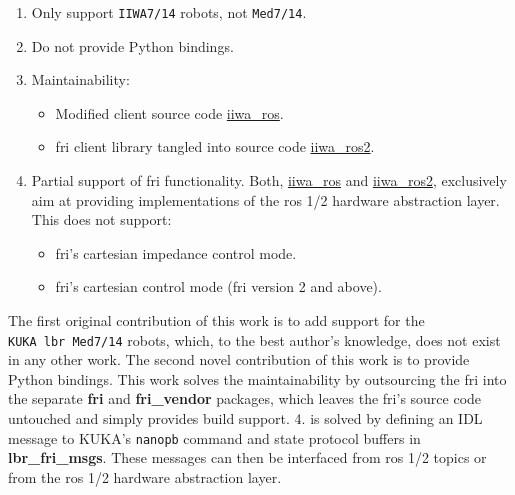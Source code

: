 \begin{enumerate}
\def\labelenumi{\arabic{enumi}.}
\item
  Only support \texttt{IIWA7/14} robots, not \texttt{Med7/14}.
\item
  Do not provide Python bindings.
\item
  Maintainability:

  \begin{itemize}
  \item
    Modified client source code
    \href{https://github.com/epfl-lasa/iiwa_ros}{iiwa\_ros}.
  \item
    \gls{fri} client library tangled into source code
    \href{https://github.com/ICube-Robotics/iiwa_ros2}{iiwa\_ros2}.
  \end{itemize}
\item
  Partial support of \gls{fri} functionality. Both,
  \href{https://github.com/epfl-lasa/iiwa_ros}{iiwa\_ros} and
  \href{https://github.com/ICube-Robotics/iiwa_ros2}{iiwa\_ros2},
  exclusively aim at providing implementations of the \gls{ros} 1/2 hardware
  abstraction layer. This does not support:

  \begin{itemize}
  \item
    \gls{fri}'s cartesian impedance control mode.
  \item
    \gls{fri}'s cartesian control mode (\gls{fri} version 2 and above).
  \end{itemize}
\end{enumerate}

The first original contribution of this work is to add support for the
\texttt{KUKA\ \gls{lbr}\ Med7/14} robots, which, to the best author's
knowledge, does not exist in any other work. The second novel
contribution of this work is to provide Python bindings. This work
solves the maintainability by outsourcing the \gls{fri} into the separate
\textbf{fri} and \textbf{fri\_vendor} packages, which leaves the \gls{fri}'s
source code untouched and simply provides build support. 4. is solved by
defining an IDL message to KUKA's \texttt{nanopb} command and state
protocol buffers in \textbf{lbr\_fri\_msgs}. These messages can then be
interfaced from \gls{ros} 1/2 topics or from the \gls{ros} 1/2 hardware abstraction
layer.


